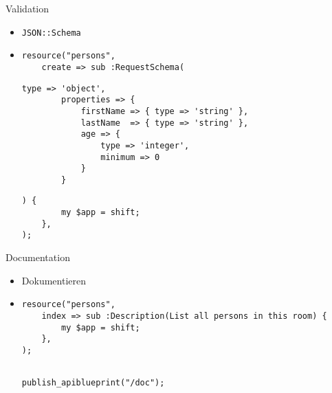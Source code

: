 
\begin{frame}[fragile]{Validation}

\begin{itemize}
\item \texttt{JSON::Schema}\cite{json-schema}
\pause
\item[]
\begin{lstlisting}
resource("persons",
    create => sub :RequestSchema(
\end{lstlisting}\pause\begin{lstlisting}[firstnumber=last]
        type => 'object',
        properties => {
            firstName => { type => 'string' },
            lastName  => { type => 'string' },
            age => {
                type => 'integer',
                minimum => 0
            }
        }
\end{lstlisting}\pause\begin{lstlisting}[firstnumber=last]
    ) {
        my $app = shift;
    },
);
\end{lstlisting}
\end{itemize}
\end{frame}


\begin{frame}[fragile]{Documentation}

\begin{itemize}
\item Dokumentieren
\pause
\item[]
\begin{lstlisting}
resource("persons",
    index => sub :Description(List all persons in this room) {
        my $app = shift;
    },
);
\end{lstlisting}\pause\begin{lstlisting}[firstnumber=last]

publish_apiblueprint("/doc");
\end{lstlisting}
\end{itemize}
\end{frame}


